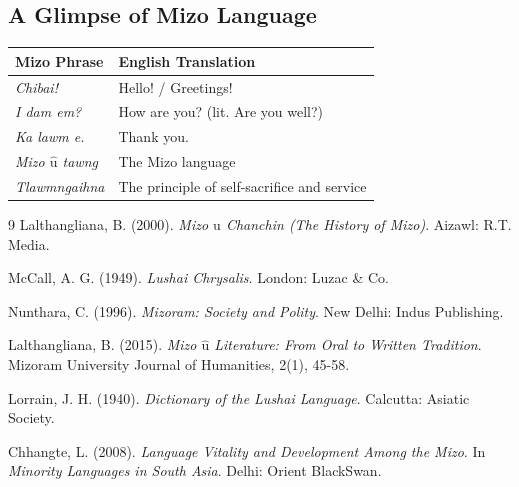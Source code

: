 \documentclass[12pt]{article}
\begin{document}
\subsection*{A Glimpse of Mizo Language}
\begin{center}
    \begin{tabular}{|l|l|}
        \hline
        \textbf{Mizo Phrase} & \textbf{English Translation} \\
        \hline
        \textit{Chibai!} & Hello! / Greetings! \\
        \textit{I dam em?} & How are you? (lit. Are you well?) \\
        \textit{Ka lawm e.} & Thank you. \\
        \textit{Mizo $\hat{\text{u}}$ tawng} & The Mizo language \\
        \textit{Tlawmngaihna} & The principle of self-sacrifice and service \\
        \hline
    \end{tabular}
\end{center}

\begin{thebibliography}{9}
    Lalthangliana, B. (2000). \textit{Mizo $\hat{\text{u}}$ Chanchin (The History of Mizo)}. Aizawl: R.T. Media.

    McCall, A. G. (1949). \textit{Lushai Chrysalis}. London: Luzac \& Co.

    Nunthara, C. (1996). \textit{Mizoram: Society and Polity}. New Delhi: Indus Publishing.

    Lalthangliana, B. (2015). \textit{Mizo $\hat{\text{u}}$ Literature: From Oral to Written Tradition}. Mizoram University Journal of Humanities, 2(1), 45-58.

    Lorrain, J. H. (1940). \textit{Dictionary of the Lushai Language}. Calcutta: Asiatic Society.

    Chhangte, L. (2008). \textit{Language Vitality and Development Among the Mizo}. In \textit{Minority Languages in South Asia}. Delhi: Orient BlackSwan.

\end{thebibliography}
\end{document}
